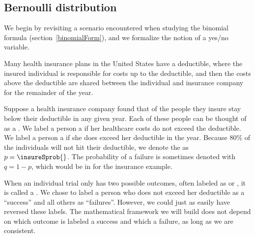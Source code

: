 \subsection{Bernoulli distribution}
\label{bernoulli}



We begin by revisiting a scenario encountered when studying the binomial formula (section~\ref{binomialForm}), and we formalize the notion of a yes/no variable.

Many health insurance plans in the United States have
a deductible, where the insured individual is responsible
for costs up to the deductible, and then the costs above
the deductible are shared between the individual and
insurance company for the remainder of the year.

Suppose a health insurance company found that \insureSperc{} of the
people they insure stay below their deductible in any given year.
Each of these people can be thought of as a .
We label a person a  if her healthcare costs
do not exceed the deductible.
We label a person a  if she does exceed her
deductible in the year.
Because 80\% of the individuals will not hit their deductible,
we denote the  as
$p = \insureSprob{}$.
The probability of a failure is sometimes denoted with
$q = 1 - p$, which would be \insureFprob{} in for the insurance
example.

When an individual trial only has two possible outcomes, often
labeled as  or , it is called a
.
We chose to label a person who does not exceed her deductible
as a ``success'' and all others as ``failures''.
However, we could just as easily have reversed these labels.
The mathematical framework we will build does not depend
on which outcome is labeled a success and which a failure,
as long as we are consistent.

